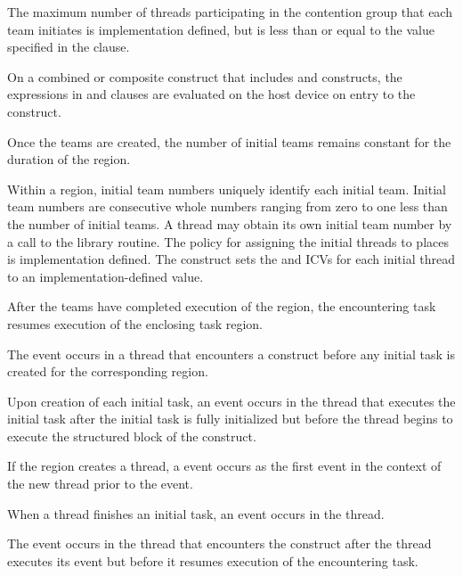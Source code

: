 The maximum number of threads participating in the contention group that 
each team initiates is implementation defined, but is less than or equal 
to the value specified in the  clause.

On a combined or composite construct that includes  and
 constructs, the expressions in  and
 clauses are evaluated on the host device on
entry to the  construct.

Once the teams are created, the number of initial teams remains constant 
for the duration of the  region.

Within a  region, initial team numbers uniquely identify each
initial team. Initial team numbers are consecutive whole numbers ranging 
from zero to one less than the number of initial teams. A thread may obtain 
its own initial team number by a call to the  library
routine. The policy for assigning the initial threads to places is 
implementation defined. The  construct sets the 
 and  ICVs for each initial 
thread to an implementation-defined value.

After the teams have completed execution of the  region, the 
encountering task resumes execution of the enclosing task region.

\events

The  event occurs in a thread that encounters a
 construct before any initial task is created for the
corresponding  region.

Upon creation of each initial task, an  event
occurs in the thread that executes the initial task after the initial
task is fully initialized but before the thread begins to execute the
structured block of the  construct.

If the  region creates a thread, a 
event occurs as the first event in the context of the new thread
prior to the  event.

When a thread finishes an initial task, an 
event occurs in the thread.

The  event occurs in the thread that encounters the
 construct after the thread executes its  
event but before it resumes execution of the encountering task.

